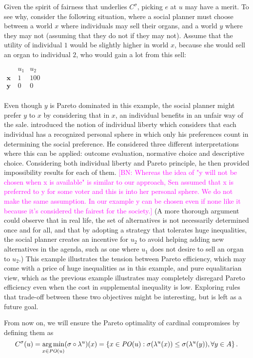\documentclass[version=3.21, pagesize, notitlepage, twoside=off, bibliography=totoc, DIV=calc, fontsize=12pt, a4paper]{scrartcl}
\newcommand{\commentBN}[1]{\textcolor{magenta}{\small$\big[$BN: #1$\big]$}}
\newcommand{\paretopt}{\mathit{PO}}
\begin{document}
\begin{remark}
	Given the spirit of fairness that underlies $C^{\sigma }$, picking $e$ at $u$ may have a merit. To see why, consider the following situation, where a social planner must choose between a world $x$ where individuals may sell their organs, and a world $y$ where they may not (assuming that they do not if they may not). Assume that the utility of individual $1$ would be slightly higher in world $x$, because she would sell an organ to individual $2$, who would gain a lot from this sell: 
	\begin{center}
		$
		\begin{array}{ccc}
		& u_1 & u_2 \\
		\mathbf{x} \ & 1 & 100 \\
		\mathbf{y} \ & 0 & 0 \\
		\end{array}
		$
	\end{center}
	Even though $y$ is Pareto dominated in this example, the social planner might prefer $y$ to $x$ by considering that in $x$, an individual benefits in an unfair way of the sale. \cite{Sen2004} introduced the notion of individual liberty which considers that each individual has a recognized personal sphere in which only his preferences count in determining the social preference. He considered three different interpretations where this can be applied: outcome evaluation, normative choice and descriptive choice. Considering both individual liberty and Pareto principle, he then provided impossibility results for each of them. \commentBN{Whereas the idea of "y will not be chosen when x is available" is similar to our approach, Sen assumed that x is preferred to y for some voter and this is into her personal sphere. We do not make the same assumption. In our example y can be chosen even if none like it because it's considered the fairest for the society.} 
	(A more thorough argument could observe that in real life, the set of alternatives is not necessarily determined once and for all, and that by adopting a strategy that tolerates huge inequalities, the social planner creates an incentive for $u_2$ to avoid helping adding new alternatives in the agenda, such as one where $u_1$ does not desire to sell an organ to $u_2$.) This example illustrates the tension between Pareto efficiency, which may come with a price of huge inequalities as in this example, and pure equalitarian view, which as the previous example illustrates may completely disregard Pareto efficiency even when the cost in supplemental inequality is low. Exploring rules that trade-off between these two objectives might be interesting, but is left as a future goal.
\end{remark}
From now on, we will ensure the Pareto optimality of cardinal compromises by defining them as 
\[C^{\sigma }(u) = \argmin_{x \in \paretopt(u)} (\sigma \circ \lambda^u)(x) = \left\{ x\in \paretopt(u):\sigma (\lambda ^{u}(x))\leq \sigma (\lambda ^{u}(y)),  \forall y\in A\right\}.\]
\end{document}
